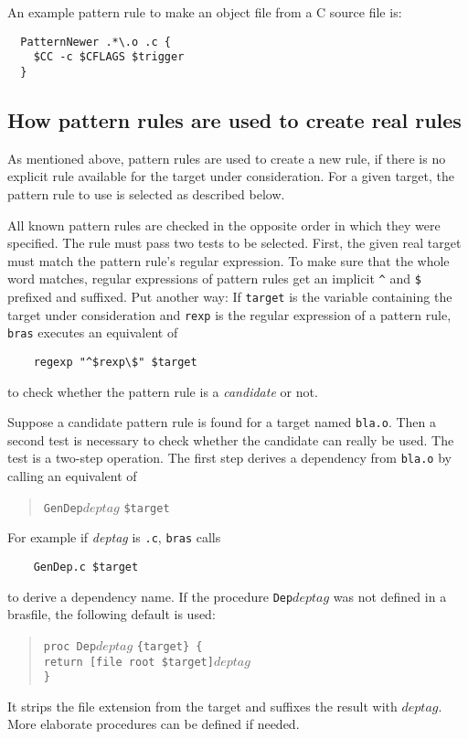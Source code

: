 \documentclass[12pt]{article}
\newcommand{\bras}{\texttt{bras}}
\begin{document}
An example pattern rule to make an object file from a C source file is:
\begin{verbatim}
  PatternNewer .*\.o .c {
    $CC -c $CFLAGS $trigger
  }
\end{verbatim}


\subsection{How pattern rules are used to create real rules}
\label{secSuffixToReal}

As mentioned above, pattern rules are used to create a new rule, if
there is no explicit rule available for the target under
consideration. 
For a given target, the pattern rule to use is selected as described
below.

All known pattern rules are checked in the opposite order in which
they were specified. The rule must pass two tests to be
selected. First, the given real target must match the pattern rule's
regular expression. To make
sure that the whole word matches, regular expressions of pattern rules
get an implicit \verb+^+ and \texttt{\$} prefixed and suffixed. Put
another way: If \texttt{target} is the variable containing the target
under consideration and \texttt{rexp} is the regular expression of a
pattern rule, \bras{} executes an equivalent of
\begin{verbatim}
    regexp "^$rexp\$" $target
\end{verbatim}
to check whether the pattern rule is a \textit{candidate} or not.

Suppose a candidate pattern rule is found for a target named
\texttt{bla.o}. Then a second test is necessary
to check whether the candidate can really be used. The test is a
two-step operation.
The first step derives a dependency
from \texttt{bla.o} by calling
an equivalent of
\begin{quote}
    \texttt{GenDep}$deptag$ \texttt{\$target}
\end{quote}
For example if \textit{deptag} is \texttt{.c}, \bras{} calls
\begin{verbatim}
    GenDep.c $target
\end{verbatim}
to derive a dependency name. If the procedure \texttt{Dep$deptag$}
was not defined in a brasfile, the following
default is used:
\begin{quote}
    \verb|proc Dep|$deptag$ \verb|{target} {|\\
    \texttt{\hspace*{2em}return [file root \$target]$deptag$}\\
    \verb|}|
\end{quote}
It strips the file extension from the target and suffixes the
result with $deptag$. More elaborate procedures can be defined if needed.
\end{document}
